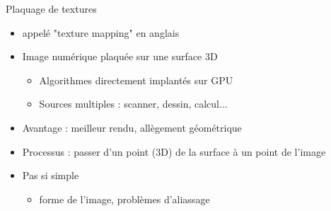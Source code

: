 \begin{frame}[t]{Plaquage de textures}
  \begin{itemize}
    \item appelé "texture mapping" en anglais
    \item Image numérique plaquée sur une surface 3D
    \begin{itemize}
      \item Algorithmes directement implantés sur GPU
      \item Sources multiples : scanner, dessin, calcul...
    \end{itemize}
    \item Avantage : meilleur rendu, allègement géométrique
    \item Processus : passer d'un point (3D) de la surface à un point de l'image
    \item Pas si simple
    \begin{itemize}
      \item forme de l'image, problèmes d'aliassage
    \end{itemize}
  \end{itemize}
\end{frame}

